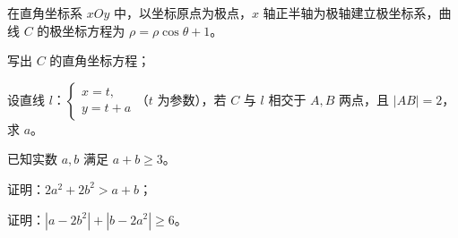 \documentclass[UTF8,12pt]{ctexart}
\begin{document}
\begin{questions}[start=17]
  \item 在直角坐标系 $xOy$ 中，以坐标原点为极点，$x$ 轴正半轴为极轴建立极坐标系，曲线
    $C$ 的极坐标方程为 $\rho = \rho \cos \theta + 1$。
    \begin{subquestions}
      \item 写出 $C$ 的直角坐标方程；
      \item 设直线 $l$：$\begin{cases}x=t,\\ y=t+a\end{cases}$（$t$ 为参数），若 $C$ 与
        $l$ 相交于 $A, B$ 两点，且 $|AB|=2$，求 $a$。
    \end{subquestions}

  \item 已知实数 $a, b$ 满足 $a + b \geqslant 3$。
    \begin{subquestions}
      \item 证明：$2a^{2}+2b^{2}>a+b$；
      \item 证明：$\left|a-2b^{2}\right|+\left|b-2a^{2}\right|\geqslant 6$。
    \end{subquestions}

\end{questions}
\end{document}
